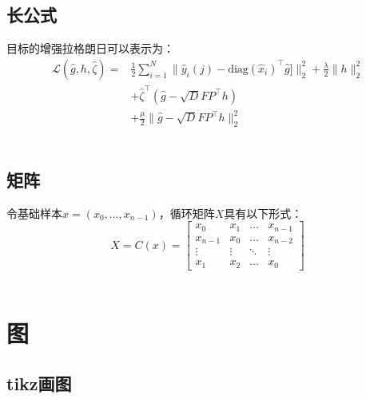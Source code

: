 \subsection{长公式}

目标的增强拉格朗日可以表示为：
~\\
\begin{equation}
\begin{aligned}
\mathcal{L}(\hat{g},h,\hat{\zeta})= &\frac{1}{2}\sum_{i=1}^N\|\hat{y}_i(j)-\mathrm{diag}(\hat{x}_i)^\top \hat{g}]\|_2^2 + \frac{\lambda}{2}\|h\|_2^2\\
                                    &+ \hat{\zeta}^\top(\hat{g}-\sqrt{D}FP^\top h)\\
                                    &+ \frac{\mu}{2}\|\hat{g}-\sqrt{D}FP^\top h\|_2^2
\end{aligned}
    \label{eq:CFwLB_augmented LagrangianObjectiveFunction}
\end{equation}
~\\

\subsection{矩阵}

令基础样本$x = (x_0,\dots,x_{n-1})$，循环矩阵$X$具有以下形式：
~\\
\begin{equation}
    X = C(x)= \begin{bmatrix}
        x_0&x_1&\dots&x_{n-1}\\
        x_{n-1}&x_0&\dots&x_{n-2}\\
        \vdots&\vdots&\ddots&\vdots\\
        x_1&x_2&\dots&x_0
        \end{bmatrix}
\label{eq:RT_circulantMatrix}
\end{equation}
~\\

\section{图}

\subsection{tikz画图}


